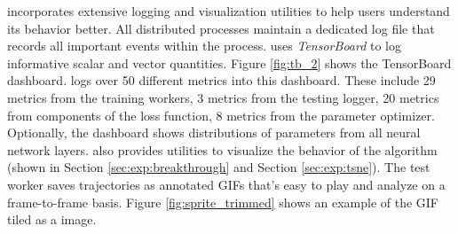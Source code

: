 \moozi incorporates extensive logging and visualization utilities to help users understand its behavior better.
All distributed processes maintain a dedicated log file that records all important events within the process.
\moozi uses \textit{TensorBoard} \cite{TensorFlowLargescaleMachine_Abadi.Agarwal.ea_2015} to log informative scalar and vector quantities.
Figure \ref{fig:tb_2} shows the \moozi TensorBoard dashboard.
\moozi logs over 50 different metrics into this dashboard.
These include 29 metrics from the training workers, 3 metrics from the testing logger, 20 metrics from components of the loss function, 8 metrics from the parameter optimizer.
Optionally, the dashboard shows distributions of parameters from all neural network layers.
\moozi also provides utilities to visualize the behavior of the algorithm (shown in Section \ref{sec:exp:breakthrough} and Section \ref{sec:exp:tsne}).
The test worker saves trajectories as annotated GIFs that's easy to play and analyze on a frame-to-frame basis.
Figure \ref{fig:sprite_trimmed} shows an example of the GIF tiled as a image.

